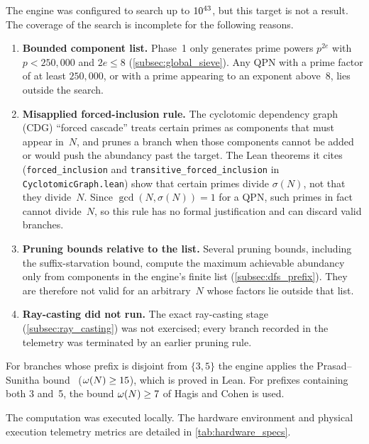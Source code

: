 The engine was configured to search up to $10^{43}$, but
this target is not a result.  The coverage of the search is incomplete
for the following reasons.
\begin{enumerate}
  \item \textbf{Bounded component list.}  Phase~1 only generates prime
    powers $p^{2e}$ with $p < 250{,}000$ and $2e \le 8$
    (\cref{subsec:global_sieve}).  Any QPN with a prime factor of at
    least $250{,}000$, or with a prime appearing to an exponent above~8,
    lies outside the search.
  \item \textbf{Misapplied forced-inclusion rule.}  The cyclotomic
    dependency graph (CDG) ``forced cascade'' treats certain primes as
    components that must appear in~$N$, and prunes a branch when those
    components cannot be added or would push the abundancy past the
    target.  The Lean theorems
    it cites (\texttt{forced\_\allowbreak{}inclusion} and
    \texttt{transitive\_\allowbreak{}forced\_\allowbreak{}inclusion} in
    \texttt{CyclotomicGraph.lean}) show that certain primes divide
    $\sigma(N)$, not that they divide~$N$.  Since
    $\gcd(N, \sigma(N)) = 1$ for a QPN, such primes in fact cannot
    divide~$N$, so this rule has no formal justification and can
    discard valid branches.
  \item \textbf{Pruning bounds relative to the list.}  Several pruning
    bounds, including the suffix-starvation bound, compute the maximum
    achievable abundancy only from components in the engine's finite
    list (\cref{subsec:dfs_prefix}).  They are therefore not valid for
    an arbitrary~$N$ whose factors lie outside that list.
  \item \textbf{Ray-casting did not run.}  The exact ray-casting stage
    (\cref{subsec:ray_casting}) was not exercised; every branch
    recorded in the telemetry was terminated by an earlier pruning
    rule.
\end{enumerate}

For branches whose prefix is disjoint from $\{3, 5\}$ the engine
applies the Prasad--Sunitha bound~\cite{prasad_sunitha}
($\omega(N) \ge 15$), which is proved in
Lean.  For prefixes containing both 3 and~5, the bound
$\omega(N) \ge 7$ of Hagis and
Cohen is used.

The computation was executed locally.  The hardware environment and physical
execution telemetry metrics are detailed in \cref{tab:hardware_specs}.

